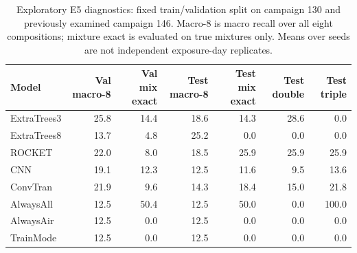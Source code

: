 \begin{table}[t]
\centering\small
\caption{Exploratory E5 diagnostics: fixed train/validation split on campaign 130 and previously examined campaign 146. Macro-8 is macro recall over all eight compositions; mixture exact is evaluated on true mixtures only. Means over seeds are not independent exposure-day replicates.}
\label{tab:e5diag}
\begin{tabular}{lrrrrrr}
\toprule
Model & Val macro-8 & Val mix exact & Test macro-8 & Test mix exact & Test double & Test triple \\
\midrule
ExtraTrees3 & 25.8 & 14.4 & 18.6 & 14.3 & 28.6 & 0.0 \\
ExtraTrees8 & 13.7 & 4.8 & 25.2 & 0.0 & 0.0 & 0.0 \\
ROCKET & 22.0 & 8.0 & 18.5 & 25.9 & 25.9 & 25.9 \\
CNN & 19.1 & 12.3 & 12.5 & 11.6 & 9.5 & 13.6 \\
ConvTran & 21.9 & 9.6 & 14.3 & 18.4 & 15.0 & 21.8 \\
AlwaysAll & 12.5 & 50.4 & 12.5 & 50.0 & 0.0 & 100.0 \\
AlwaysAir & 12.5 & 0.0 & 12.5 & 0.0 & 0.0 & 0.0 \\
TrainMode & 12.5 & 0.0 & 12.5 & 0.0 & 0.0 & 0.0 \\
\bottomrule
\end{tabular}
\end{table}
